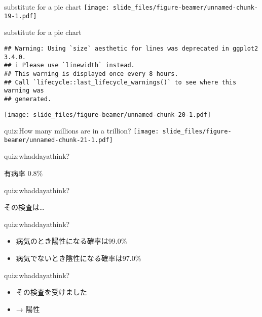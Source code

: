 \documentclass[
  ignorenonframetext,
]{beamer}
\providecommand{\tightlist}{%
  \setlength{\itemsep}{0pt}\setlength{\parskip}{0pt}}
\begin{document}
\begin{frame}{substitute for a pie chart}
\protect\hypertarget{substitute-for-a-pie-chart-1}{}
\texttt{[image: slide\_files/figure-beamer/unnamed-chunk-19-1.pdf]}
\end{frame}

\begin{frame}[fragile]{substitute for a pie chart}
\protect\hypertarget{substitute-for-a-pie-chart-2}{}
\begin{verbatim}
## Warning: Using `size` aesthetic for lines was deprecated in ggplot2 3.4.0.
## i Please use `linewidth` instead.
## This warning is displayed once every 8 hours.
## Call `lifecycle::last_lifecycle_warnings()` to see where this warning was
## generated.
\end{verbatim}

\texttt{[image: slide\_files/figure-beamer/unnamed-chunk-20-1.pdf]}
\end{frame}

\begin{frame}{quiz:How many millions are in a trillion?}
\protect\hypertarget{quizhow-many-millions-are-in-a-trillion-2}{}
\texttt{[image: slide\_files/figure-beamer/unnamed-chunk-21-1.pdf]}
\end{frame}

\begin{frame}{quiz:whaddayathink?}
\protect\hypertarget{quizwhaddayathink}{}
\Huge

有病率 0.8\%
\end{frame}

\begin{frame}{quiz:whaddayathink?}
\protect\hypertarget{quizwhaddayathink-1}{}
\Large

その検査は\ldots{}
\end{frame}

\begin{frame}{quiz:whaddayathink?}
\protect\hypertarget{quizwhaddayathink-2}{}
\Large

\begin{itemize}[<+->]
\tightlist
\item
  \textbullet{}\hspace{2pt}病気のとき陽性になる確率は99.0\%
\item
  \textbullet{}\hspace{2pt}病気でないとき陰性になる確率は97.0\%
\end{itemize}
\end{frame}

\begin{frame}{quiz:whaddayathink?}
\protect\hypertarget{quizwhaddayathink-3}{}
\Huge

\begin{itemize}[<+->]
\item
  その検査を受けました
\item
  → 陽性
\end{itemize}
\end{frame}
\end{document}
